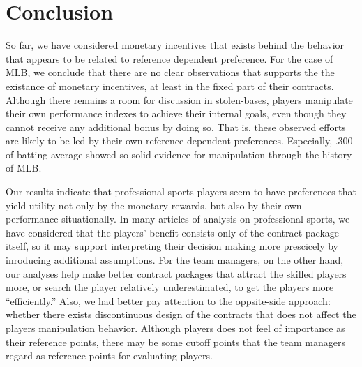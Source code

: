 \documentclass[dvipdfmx, 12pt]{article}
\begin{document}
\begin{landscape}
  \begin{table}
    
  \end{table}
\end{landscape}

\begin{landscape}
  \begin{table}
    
  \end{table}
\end{landscape}


\section{Conclusion}

So far, we have considered monetary incentives that exists behind the behavior that appears to be related to reference dependent preference. For the case of MLB, we conclude that there are no clear observations that supports the the existance of monetary incentives, at least in the fixed part of their contracts. Although there remains a room for discussion in stolen-bases, players manipulate their own performance indexes to achieve their internal goals, even though they cannot receive any additional bonus by doing so. That is, these observed efforts are likely to be led by their own reference dependent preferences. Especially, .300 of batting-average showed so solid evidence for manipulation through the history of MLB.

Our results indicate that professional sports players seem to have preferences that yield utility not only by the monetary rewards, but also by their own performance situationally. In many articles of analysis on professional sports, we have considered that the players' benefit consists only of the contract package itself, so it may support interpreting their decision making more prescicely by inroducing additional assumptions. For the team managers, on the other hand, our analyses help make better contract packages that attract the skilled players more, or search the player relatively underestimated, to get the players more ``efficiently.'' Also, we had better pay attention to the oppsite-side approach: whether there exists discontinuous design of the contracts that does not affect the players manipulation behavior. Although players does not feel of importance as their reference points, there may be some cutoff points that the team managers regard as reference points for evaluating players.
\end{document}
